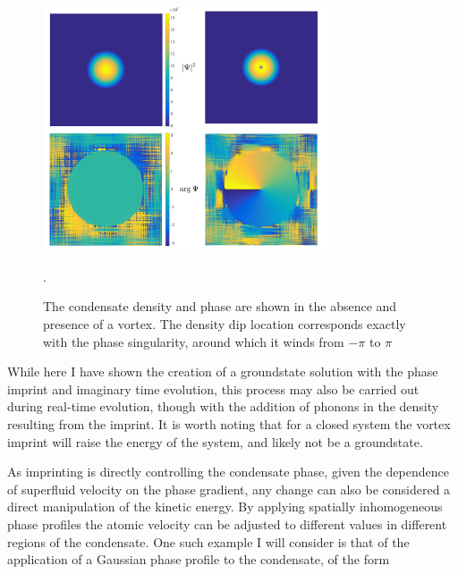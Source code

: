 \begin{figure}\centering
    \includegraphics[width=0.75\textwidth]{Images/ch4_vtx/1vtxbec.pdf}
    \caption{The condensate density and phase are shown in the absence and presence of a vortex. The density dip location corresponds exactly with the phase singularity, around which it winds from $-\pi$ to $\pi$}.\label{fig:0to1vtx}
\end{figure}
While here I have shown the creation of a groundstate solution with the phase imprint and imaginary time evolution, this process may also be carried out during real-time evolution, though with the addition of phonons in the density resulting from the imprint. It is worth noting that for a closed system the vortex imprint will raise the energy of the system, and likely not be a groundstate.

As imprinting is directly controlling the condensate phase, given the dependence of superfluid velocity on the phase gradient, any change can also be considered a direct manipulation of the kinetic energy. By applying spatially inhomogeneous phase profiles the atomic velocity can be adjusted to different values in different regions of the condensate. One such example I will consider is that of the application of a Gaussian phase profile to the condensate, of the form

